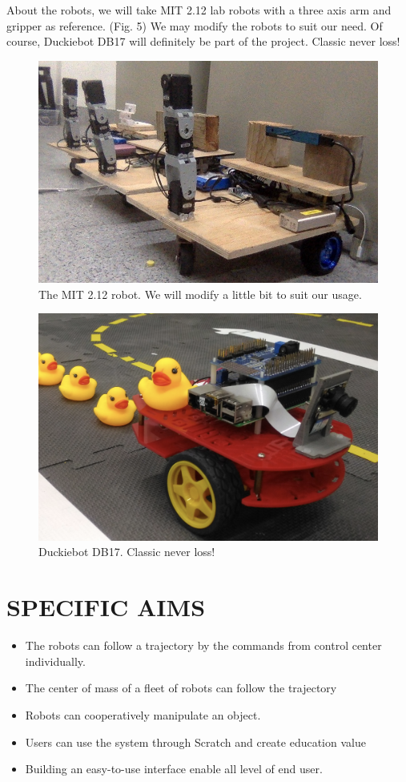 \documentclass[letterpaper, 10 pt, conference]{ieeeconf}  %
\begin{document}
About the robots, we will take MIT 2.12 lab robots with a three axis arm and gripper as reference. (Fig. 5) We may modify the robots to suit our need. Of course, Duckiebot DB17 will definitely be part of the project. Classic never loss!
\begin{figure}[h] %
\includegraphics[width=0.8\columnwidth]{robot}
\centering
\caption{The MIT 2.12 robot. We will modify a little bit to suit our usage.}
 \label{figure:robot}
\end{figure}
\begin{figure}[h] %
\includegraphics[width=0.95\columnwidth]{DB17}
\centering
\caption{Duckiebot DB17. Classic never loss!}
 \label{figure:DB17}
\end{figure}

\section{SPECIFIC AIMS}

\begin{itemize}
\item The robots can follow a trajectory by the commands from control center individually.
\item The center of mass of a fleet of robots can follow the trajectory
\item Robots can cooperatively manipulate an object.
\item Users can use the system through Scratch and create education value
\item Building an easy-to-use interface enable all level of end user.
\end{itemize}
\end{document}
